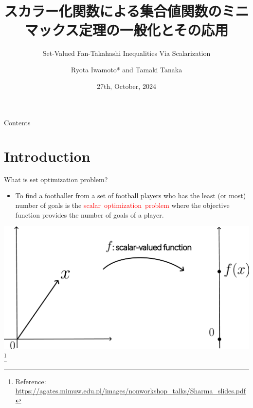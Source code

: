 \documentclass[aspectratio=169, dvipdfmx, 11pt]{beamer}
\title{スカラー化関数による集合値関数のミニマックス定理の一般化とその応用}
\subtitle{Set-Valued Fan-Takahashi Inequalities Via Scalarization}
\author[Ryota Iwamoto]{Ryota Iwamoto* and Tamaki Tanaka}
\institute[Niigata Univ]{Niigata Univ}
\date{27th, October, 2024}
\begin{document}
\maketitle

\begin{frame}{Contents}
  \tableofcontents
\end{frame}

\section{Introduction}

\begin{frame}{What is set optimization problem?}
  \begin{itemize}
    \item To find a footballer from a set of football players who
          has the least (or most) number of goals is
          the \textcolor{red}{scalar~optimization~problem}
          where the objective function provides the number
          of goals of a player.
  \end{itemize}
  \centering
  \includegraphics[keepaspectratio, scale=0.08]{figures/eps/scalar_opt.eps}
  \renewcommand{\thefootnote}{\fnsymbol{footnote}}%
  \footnote[0]{Reference: \url{https://agates.mimuw.edu.pl/images/nonworkshop_talks/Sharma_slides.pdf}}
\end{frame}
\end{document}
